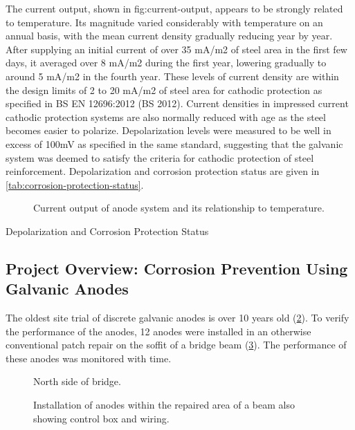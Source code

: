 The current output, shown in {fig:current-output}, appears to be strongly related to temperature. Its magnitude varied considerably with temperature on an annual basis, with the mean current density gradually reducing year by year. After supplying an initial current of over 35 mA/m2 of steel area in the first few days, it averaged over 8 mA/m2 during the first year, lowering gradually to around 5 mA/m2 in the fourth year. These levels of current density are within the design limits of 2 to 20 mA/m2 of steel area for cathodic protection as specified in BS EN 12696:2012 (BS 2012). Current densities in impressed current cathodic protection systems are also normally reduced with age as the steel becomes easier to polarize. Depolarization levels were measured to be well in excess of 100mV as specified in the same standard, suggesting that the galvanic system was deemed to satisfy the criteria for cathodic protection of steel reinforcement. Depolarization and corrosion protection status are given in \cref{tab:corrosion-protection-status}.

\begin{figure}
  \caption{Current output of anode system and its relationship to temperature.}\label{fig:current-output}
\end{figure}

\begin{table}
  \caption{Depolarization and Corrosion Protection Status}\label{tab:corrosion-protection-status}
\end{table}


\subsection{Project Overview: Corrosion Prevention Using Galvanic Anodes}
The oldest site trial of discrete galvanic anodes is over 10 years old (\cref{fig:bridge=north-side}). To verify the performance of the anodes, 12 anodes were installed in an otherwise conventional patch repair on the soffit of a bridge beam (\cref{fig:installation-anodes}). The performance of these anodes was monitored with time.

\begin{figure}
  \caption{North side of bridge.}\label{fig:bridge=north-side}
\end{figure}
\begin{figure}
  \caption{Installation of anodes within the repaired area of a beam also showing control box and wiring.}\label{fig:installation-anodes}
\end{figure}

